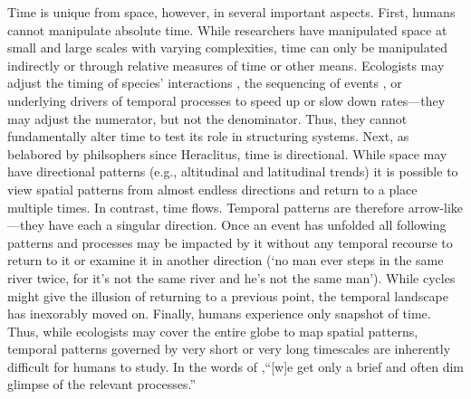 \documentclass[11pt,a4paper,oneside]{article}
\begin{document}
Time is unique from space, however, in several important aspects. First, humans cannot manipulate absolute time. While researchers have manipulated space at small \citep[e.g.,][]{huffaker} and large \citep[e.g.,][]{Terborgh:2001bw} scales with varying complexities, time can only be manipulated indirectly or through relative measures of time or other means. Ecologists may adjust the timing of species' interactions \citep{Yang:2010cq}, the sequencing of events \citep{vannette2014}, or underlying drivers of temporal processes to speed up or slow down rates---they may adjust the numerator, but not the denominator. Thus, they cannot fundamentally alter time to test its role in structuring systems. Next, as belabored by philsophers since Heraclitus, time is directional. While space may have directional patterns (e.g., altitudinal and latitudinal trends) it is possible to view spatial patterns from almost endless directions and return to a place multiple times. In contrast, time flows. Temporal patterns are therefore arrow-like---they have each a singular direction. Once an event has unfolded all following patterns and processes may be impacted by it without any temporal recourse to return to it or examine it in another direction (`no man ever steps in the same river twice, for it's not the same river and he's not the same man'). While cycles might give the illusion of returning to a previous point, the temporal landscape has inexorably moved on. Finally, humans experience only snapshot of time. Thus, while ecologists may cover the entire globe to map spatial patterns, temporal patterns governed by very short or very long timescales are inherently difficult for humans to study. In the words of \citet{wiens1986},``[w]e get only a brief and often dim glimpse of the relevant processes.'' \\
\end{document}
